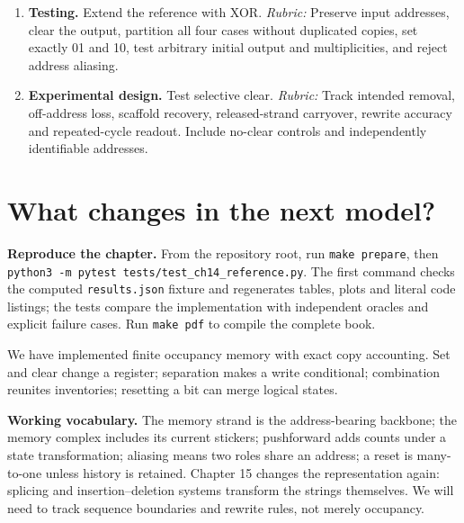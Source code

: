 \begin{enumerate}
Copy count is not the uncertainty in the logical state. Entropy requires
a probability distribution over possible values and a specified observer.
\item \textbf{Testing.} Extend the reference with XOR.
\textit{Rubric:} Preserve input addresses, clear the output, partition all
four cases without duplicated copies, set exactly 01 and 10, test arbitrary
initial output and multiplicities, and reject address aliasing.
\item \textbf{Experimental design.} Test selective clear.
\textit{Rubric:} Track intended removal, off-address loss, scaffold recovery,
released-strand carryover, rewrite accuracy and repeated-cycle readout.
Include no-clear controls and independently identifiable addresses.
\end{enumerate}

\section{What changes in the next model?}
\textbf{Reproduce the chapter.} From the repository root, run
\texttt{make prepare}, then
\texttt{python3 -m pytest tests/test\_ch14\_reference.py}.
The first command checks the computed \texttt{results.json} fixture and regenerates tables, plots and literal
code listings; the tests compare the implementation with independent
oracles and explicit failure cases. Run \texttt{make pdf} to compile the complete book.

We have implemented finite occupancy memory with exact copy accounting.
Set and clear change a register; separation makes a write conditional;
combination reunites inventories; resetting a bit can merge logical states.

\textbf{Working vocabulary.} The memory strand is the address-bearing
backbone; the memory complex includes its current stickers; pushforward
adds counts under a state transformation; aliasing means two roles share
an address; a reset is many-to-one unless history is retained.
Chapter 15 changes the representation again: splicing and
insertion--deletion systems transform the strings themselves. We will need
to track sequence boundaries and rewrite rules, not merely occupancy.

